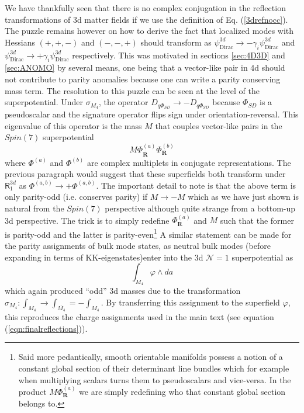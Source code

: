 \documentclass[12pt]{article}%
\numberwithin{equation}{section}
\renewcommand{\(}{\left(}
\renewcommand{\)}{\right)}
\renewcommand{\[}{\left[}
\renewcommand{\]}{\right]}
\begin{document}
We have thankfully seen that there is no complex conjugation in the reflection transformations of 3d matter fields if we use the definition of Eq. (\ref{3drefnocc}). The puzzle remains however on how to derive the fact that localized modes with Hessians $(+,+,-)$ and $(-,-,+)$ should transform as $\psi^{3d}_{\mathrm{Dirac}}\rightarrow - \gamma_i \psi^{3d}_{\mathrm{Dirac}}$ and $\psi^{3d}_{\mathrm{Dirac}}\rightarrow + \gamma_i \psi^{3d}_{\mathrm{Dirac}}$ respectively. This was motivated in sections \ref{sec:4D3D} and \ref{sec:ANOMO} by several means, one being that a vector-like pair in 4d should not contribute to parity anomalies because one can write a parity conserving mass term. The resolution to this puzzle can be seen at the level of the superpotential. Under $\sigma_{M_4}$, the operator $D_{q\Phi_{SD}}\rightarrow -D_{q\Phi_{SD}}$ because $\Phi_{SD}$ is a pseudoscalar and the signature operator flips sign under orientation-reversal. This eigenvalue of this operator is the mass $M$ that couples vector-like pairs in the $Spin(7)$ superpotential
\begin{equation}
M\Phi^{(a)}_{\overline{\mathbf{R}}} \Phi^{(b)}_\mathbf{R}
\end{equation}
where $\Phi^{(a)}$ and $\Phi^{(b)}$ are complex multiplets in conjugate representations. The previous paragraph would suggest that these superfields both transform under $\mathsf{R}^{3d}_1$ as $\Phi^{(a,b)}\rightarrow +\Phi^{(a,b)}$. The important detail to note is that the above term is only parity-odd (i.e. conserves parity) if $M\rightarrow -M$ which as we have just shown is natural from the $Spin(7)$ perspective although quite strange from a bottom-up 3d perspective. The trick is to simply redefine $\Phi^{(a)}_{\mathbf{R}}$ and $M$ such that the former is parity-odd and the latter is parity-even\footnote{Said more pedantically, smooth orientable manifolds possess a notion of a constant global section of their determinant line bundles which for example when multiplying scalars turns them to pseudoscalars and vice-versa. In the product $M\Phi^{(a)}_{\mathbf{R}}$ we are simply redefining who that constant global section belongs to.} A similar statement can be made for the parity assignments of bulk mode states, as neutral bulk modes (before expanding in terms of KK-eigenstates)enter into the 3d $\mathcal{N}=1$ superpotential as
\begin{equation}
  \int_{M_4} \varphi \wedge da
\end{equation}
which again produced ``odd'' 3d masses due to the transformation $\sigma_{M_4}:\int_{M_4}\rightarrow \int_{\overline{M_4}}=-\int_{M_4}$. By transferring this assignment to the superfield $\varphi$, this reproduces the charge assignments used in the main text (see equation (\ref{eqn:finalreflections})).
\end{document}
